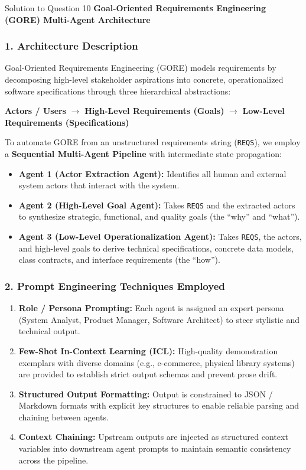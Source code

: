 \documentclass[11pt,a4paper]{article}
\begin{document}
\bigskip

\begin{solutionbox}{Solution to Question 10}
\textbf{Goal-Oriented Requirements Engineering (GORE) Multi-Agent Architecture}

\subsubsection*{1. Architecture Description}
Goal-Oriented Requirements Engineering (GORE) models requirements by decomposing high-level stakeholder aspirations into concrete, operationalized software specifications through three hierarchical abstractions:
\begin{center}
\textbf{Actors / Users} $\longrightarrow$ \textbf{High-Level Requirements (Goals)} $\longrightarrow$ \textbf{Low-Level Requirements (Specifications)}
\end{center}

To automate GORE from an unstructured requirements string (\texttt{REQS}), we employ a \textbf{Sequential Multi-Agent Pipeline} with intermediate state propagation:
\begin{itemize}
    \item \textbf{Agent 1 (Actor Extraction Agent):} Identifies all human and external system actors that interact with the system.
    \item \textbf{Agent 2 (High-Level Goal Agent):} Takes \texttt{REQS} and the extracted actors to synthesize strategic, functional, and quality goals (the ``why'' and ``what'').
    \item \textbf{Agent 3 (Low-Level Operationalization Agent):} Takes \texttt{REQS}, the actors, and high-level goals to derive technical specifications, concrete data models, class contracts, and interface requirements (the ``how'').
\end{itemize}

\subsubsection*{2. Prompt Engineering Techniques Employed}
\begin{enumerate}
    \item \textbf{Role / Persona Prompting:} Each agent is assigned an expert persona (System Analyst, Product Manager, Software Architect) to steer stylistic and technical output.
    \item \textbf{Few-Shot In-Context Learning (ICL):} High-quality demonstration exemplars with diverse domains (e.g., e-commerce, physical library systems) are provided to establish strict output schemas and prevent prose drift.
    \item \textbf{Structured Output Formatting:} Output is constrained to JSON / Markdown formats with explicit key structures to enable reliable parsing and chaining between agents.
    \item \textbf{Context Chaining:} Upstream outputs are injected as structured context variables into downstream agent prompts to maintain semantic consistency across the pipeline.
\end{enumerate}


\end{solutionbox}
\end{document}
